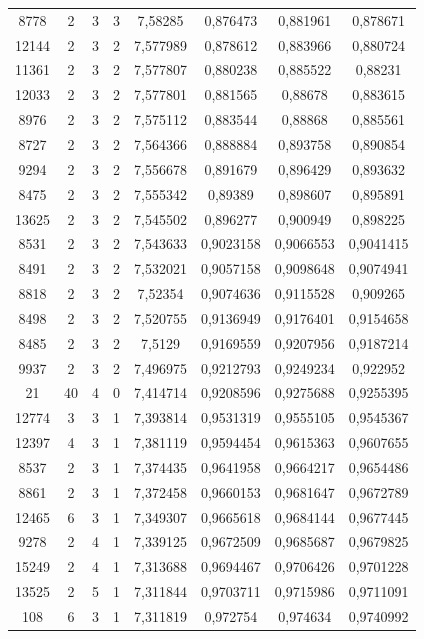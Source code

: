 \begin{longtable}{|c|c|c|c|c|c|c|c|}
8778 & 2 & 3 & 3 & 7,58285 & 0,876473 & 0,881961 & 0,878671 \\
12144 & 2 & 3 & 2 & 7,577989 & 0,878612 & 0,883966 & 0,880724 \\
11361 & 2 & 3 & 2 & 7,577807 & 0,880238 & 0,885522 & 0,88231 \\
12033 & 2 & 3 & 2 & 7,577801 & 0,881565 & 0,88678 & 0,883615 \\
8976 & 2 & 3 & 2 & 7,575112 & 0,883544 & 0,88868 & 0,885561 \\
8727 & 2 & 3 & 2 & 7,564366 & 0,888884 & 0,893758 & 0,890854 \\
9294 & 2 & 3 & 2 & 7,556678 & 0,891679 & 0,896429 & 0,893632 \\
8475 & 2 & 3 & 2 & 7,555342 & 0,89389 & 0,898607 & 0,895891 \\
13625 & 2 & 3 & 2 & 7,545502 & 0,896277 & 0,900949 & 0,898225 \\
8531 & 2 & 3 & 2 & 7,543633 & 0,9023158 & 0,9066553 & 0,9041415 \\
8491 & 2 & 3 & 2 & 7,532021 & 0,9057158 & 0,9098648 & 0,9074941 \\
8818 & 2 & 3 & 2 & 7,52354 & 0,9074636 & 0,9115528 & 0,909265 \\
8498 & 2 & 3 & 2 & 7,520755 & 0,9136949 & 0,9176401 & 0,9154658 \\
8485 & 2 & 3 & 2 & 7,5129 & 0,9169559 & 0,9207956 & 0,9187214 \\
9937 & 2 & 3 & 2 & 7,496975 & 0,9212793 & 0,9249234 & 0,922952 \\
21 & 40 & 4 & 0 & 7,414714 & 0,9208596 & 0,9275688 & 0,9255395 \\
12774 & 3 & 3 & 1 & 7,393814 & 0,9531319 & 0,9555105 & 0,9545367 \\
12397 & 4 & 3 & 1 & 7,381119 & 0,9594454 & 0,9615363 & 0,9607655 \\
8537 & 2 & 3 & 1 & 7,374435 & 0,9641958 & 0,9664217 & 0,9654486 \\
8861 & 2 & 3 & 1 & 7,372458 & 0,9660153 & 0,9681647 & 0,9672789 \\
12465 & 6 & 3 & 1 & 7,349307 & 0,9665618 & 0,9684144 & 0,9677445 \\
9278 & 2 & 4 & 1 & 7,339125 & 0,9672509 & 0,9685687 & 0,9679825 \\
15249 & 2 & 4 & 1 & 7,313688 & 0,9694467 & 0,9706426 & 0,9701228 \\
13525 & 2 & 5 & 1 & 7,311844 & 0,9703711 & 0,9715986 & 0,9711091 \\
108 & 6 & 3 & 1 & 7,311819 & 0,972754 & 0,974634 & 0,9740992 \\

\end{longtable}
